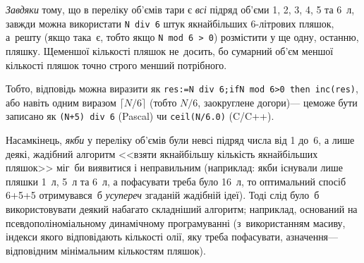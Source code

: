\Tutorial	
\emph{Завдяки} тому, що в переліку об'ємів тари є \emph{всі} підряд об'єми 1, 2, 3, 4, 5 та 6~л, завжди можна використати \verb"N div 6" штук якнайбільших 6-літрових пляшок, а~решту (якщо така~є, тобто якщо \verb"N mod 6 > 0") розмістити у ще одну, останню, пляшку. Ще\nolinebreak[3] меншої кількості пляшок не~досить, бо сумарний об'єм меншої кількості пляшок точно строго менший потрібного.

Тобто, відповідь можна виразити як \texttt{res:=N~div~6;\linebreak[1] if\nolinebreak[3] N~mod~6>0 then inc(res)}, або навіть одним виразом $\lceil{}N/6\rceil$ (тобто $N/6$, заокруглене догори)\nolinebreak[3] --- це\nolinebreak[3] може бути записано як \verb"(N+5) div 6" (Pascal) чи \verb"ceil(N/6.0)" (C/C++).

Насамкінець, \emph{якби} у переліку об'ємів були не\nolinebreak[3] всі підряд числа від 1 до~6, а лише деякі, жадібний алгоритм <<взяти якнайбільшу кількість якнайбільших пляшок>> міг~би виявитися і неправильним (наприклад: якби існували лише пляшки 1~л, 5~л та 6~л, а пофасувати треба було 16~л, то оптимальний спосіб 
\mbox{6+5+5}
отримувався~б \emph{усупереч} згаданій жадібній ідеї).
Тоді слід було~б використовувати деякий набагато складніший алгоритм; наприклад, оснований на псевдополіноміальному динамічному програмуванні (з~використанням масиву, індекси якого відповідають кількості олії, яку треба пофасувати, а\nolinebreak[3] значення\nolinebreak[3] --- відповідним мінімальним кількостям пляшок).